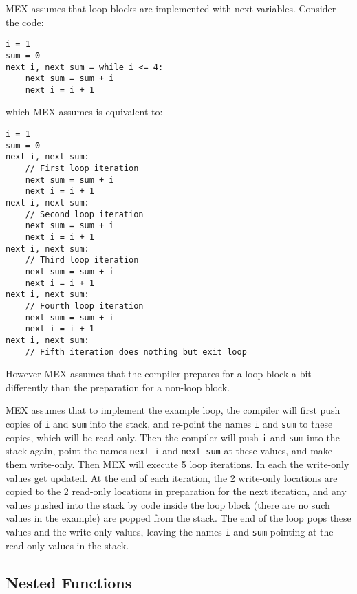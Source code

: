 \documentclass[12pt]{article}
\newenvironment{indpar}[1][0.3in]%
	{\begin{list}{}%
		     {\setlength{\itemsep}{0in}%
		      \setlength{\topsep}{0in}%
		      \setlength{\parsep}{1ex}%
		      \setlength{\labelwidth}{#1}%
		      \setlength{\leftmargin}{#1}%
		      \addtolength{\leftmargin}{\labelsep}}%
	 \item}%
	{\end{list}}
\begin{document}
MEX assumes that loop blocks are implemented with next variables.
Consider the code:
\begin{indpar}\label{EXAMPLE-LOOP}\begin{verbatim}
i = 1
sum = 0
next i, next sum = while i <= 4:
    next sum = sum + i
    next i = i + 1
\end{verbatim}\end{indpar}
which MEX assumes is equivalent to:
\begin{indpar}\begin{verbatim}
i = 1
sum = 0
next i, next sum:
    // First loop iteration
    next sum = sum + i
    next i = i + 1
next i, next sum:
    // Second loop iteration
    next sum = sum + i
    next i = i + 1
next i, next sum:
    // Third loop iteration
    next sum = sum + i
    next i = i + 1
next i, next sum:
    // Fourth loop iteration
    next sum = sum + i
    next i = i + 1
next i, next sum:
    // Fifth iteration does nothing but exit loop
\end{verbatim}\end{indpar}
However MEX assumes that the compiler prepares for a loop
block a bit differently than the preparation for
a non-loop block.

MEX assumes that to implement the example loop, the compiler
will first push copies of {\tt i} and {\tt sum} into
the stack, and re-point the names {\tt i} and {\tt sum} to these
copies, which will be read-only.
Then the compiler will push {\tt i} and {\tt sum}
into the stack again, point the names {\tt next i} and
{\tt next sum} at these values, and make them write-only.
Then MEX will execute 5 loop iterations.  In each the
write-only values get updated.  At the end of each
iteration, the 2 write-only locations are copied to the
2 read-only locations in preparation for the next
iteration, and any values pushed into the stack by
code inside the loop block (there are no such values
in the example) are popped from the stack.  The end of
the loop pops these values and the write-only values,
leaving the names {\tt i} and {\tt sum} pointing at the read-only values
in the stack.

\subsection{Nested Functions}
\label{NESTED-FUNCTIONS}
\end{document}
